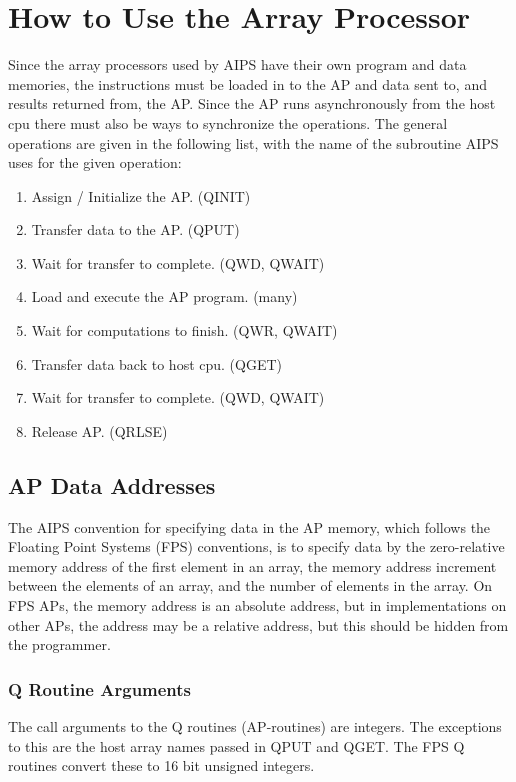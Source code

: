 \section{How to Use the Array Processor }
 Since the array processors used by AIPS have their own program and
data memories, the instructions must be loaded in to the AP and data
sent to, and results returned from, the AP.  Since the AP runs
asynchronously from the host cpu there must also be ways to
synchronize the operations.  The general operations are given in the
following list, with the name of the subroutine AIPS uses for the
given operation:
\begin{enumerate} %
\item Assign / Initialize the AP. (QINIT)
\item Transfer data to the AP. (QPUT)
\item Wait for transfer to complete. (QWD, QWAIT)
\item Load and execute the AP program. (many)
\item Wait for computations to finish. (QWR, QWAIT)
\item Transfer data back to host cpu. (QGET)
\item Wait for transfer to complete. (QWD, QWAIT)
\item Release AP. (QRLSE)

\end{enumerate} %

\subsection{AP Data Addresses }

 The AIPS convention for specifying data in the AP memory, which
follows the Floating Point Systems
(FPS) conventions, is to specify
data by the zero-relative memory address of the first element in an
array, the memory address increment between the elements of an array,
and the number of elements in the array.  On FPS APs, the memory
address is an absolute address, but in implementations on other APs,
the address may be a relative address, but this should be hidden from
the programmer.

\subsubsection{Q Routine Arguments }
The call arguments to the Q routines (AP-routines) are integers.  The
exceptions to this are the host array names passed in QPUT and QGET.
The FPS Q routines convert these to 16 bit unsigned integers.

